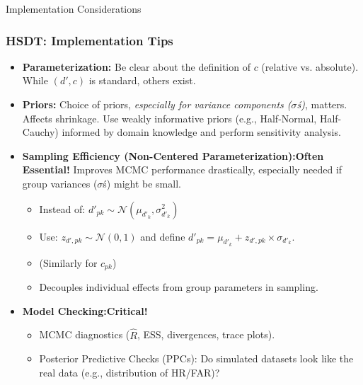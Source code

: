 \documentclass[aspectratio=169]{beamer}
\begin{document}
\begin{frame}[fragile]{Implementation Considerations}
    \frametitle{HSDT: Implementation Tips}
    \begin{itemize}
        \item \textbf{Parameterization:}
                    Be clear about the definition of $c$ (relative vs. absolute). While $(d', c)$ is standard, others exist.
        \pause
        \item \textbf{Priors:}
                    Choice of priors, \emph{especially for variance components ($\sigma$\'s)}, matters. Affects shrinkage. Use weakly informative priors (e.g., Half-Normal, Half-Cauchy) informed by domain knowledge and perform sensitivity analysis.
        \pause
        \item \textbf{Sampling Efficiency (Non-Centered Parameterization):}\quad \textbf{Often Essential!}
            Improves MCMC performance drastically, especially needed if group variances ($\sigma$\'s) might be small.
            \begin{itemize}
                \item Instead of: $d'_{pk} \sim \mathcal{N}(\mu_{d'_k}, \sigma^2_{d'_k})$
                \item Use: $z_{d', pk} \sim \mathcal{N}(0, 1)$ and define $d'_{pk} = \mu_{d'_k} + z_{d', pk} \times \sigma_{d'_k}$.
                \item (Similarly for $c_{pk}$)
                \item Decouples individual effects from group parameters in sampling.
            \end{itemize}
        \pause
        \item \textbf{Model Checking:}\quad \textbf{Critical!}
            \begin{itemize}
                \item MCMC diagnostics ($\hat{R}$, ESS, divergences, trace plots).
                \item Posterior Predictive Checks (PPCs): Do simulated datasets look like the real data (e.g., distribution of HR/FAR)?
            \end{itemize}
    \end{itemize}
\end{frame}
\end{document}
